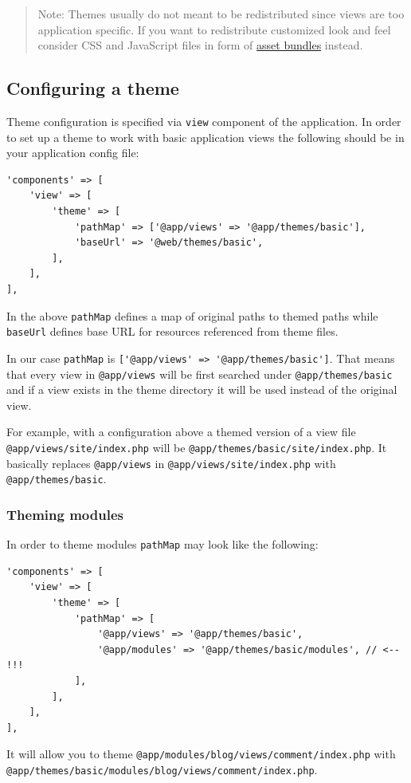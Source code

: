 \begin{quote}Note: Themes usually do not meant to be redistributed since views are too application specific. If you want to
  redistribute customized look and feel consider CSS and JavaScript files in form of \hyperref[structure-assets.md]{asset bundles} instead.

\end{quote}
\subsection{Configuring a theme}
Theme configuration is specified via \lstinline|view| component of the application. In order to set up a theme to work with basic
application views the following should be in your application config file:

\lstset{language=php}\begin{lstlisting}
'components' => [
    'view' => [
        'theme' => [
            'pathMap' => ['@app/views' => '@app/themes/basic'],
            'baseUrl' => '@web/themes/basic',
        ],
    ],
],
\end{lstlisting}
In the above \lstinline|pathMap| defines a map of original paths to themed paths while \lstinline|baseUrl| defines base URL for
resources referenced from theme files.

In our case \lstinline|pathMap| is \lstinline|['@app/views' => '@app/themes/basic']|. That means that every view in \lstinline|@app/views| will be
first searched under \lstinline|@app/themes/basic| and if a view exists in the theme directory it will be used instead of the
original view.

For example, with a configuration above a themed version of a view file \lstinline|@app/views/site/index.php| will be
\lstinline|@app/themes/basic/site/index.php|. It basically replaces \lstinline|@app/views| in \lstinline|@app/views/site/index.php| with
\lstinline|@app/themes/basic|.

\subsubsection{Theming modules}
In order to theme modules \lstinline|pathMap| may look like the following:

\lstset{language=php}\begin{lstlisting}
'components' => [
    'view' => [
        'theme' => [
            'pathMap' => [
                '@app/views' => '@app/themes/basic',
                '@app/modules' => '@app/themes/basic/modules', // <-- !!!
            ],
        ],
    ],
],
\end{lstlisting}
It will allow you to theme \lstinline|@app/modules/blog/views/comment/index.php| with \lstinline|@app/themes/basic/modules/blog/views/comment/index.php|.

